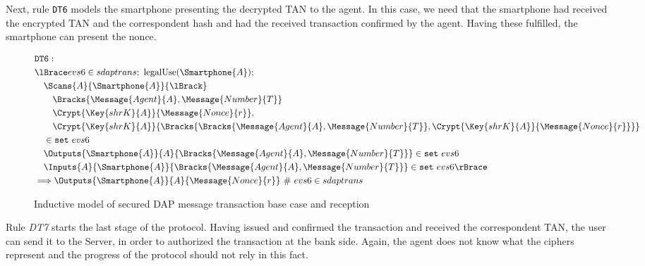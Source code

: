 Next, rule \texttt{DT6} models the smartphone presenting the decrypted TAN to the agent. In this case, we need that the smartphone had received the encrypted TAN and the correspondent hash and had the received transaction confirmed by the agent. Having these fulfilled, the smartphone can present the nonce.

\begin{figure}[!h]
  \begin{align*}
    & \texttt{DT6}: \newline \\
    & \lBrace evs6 \in sdaptrans;\ \text{legalUse}(\Smartphone{A}); \\
    & \quad \Scans{A}{\Smartphone{A}}{\lBrack} \\
    & \qquad \Bracks{\Message{Agent}{A}, \Message{Number}{T}} \\
    & \qquad \Crypt{\Key{shrK}{A}}{\Message{Nonce}{r}}, \\
    & \qquad \Crypt{\Key{shrK}{A}}{\Bracks{\Bracks{\Message{Agent}{A}, \Message{Number}{T}}, \Crypt{\Key{shrK}{A}}{\Message{Nonce}{r}}}} \\
    & \quad \in \texttt{set} \ evs6 \\
    & \quad \Outputs{\Smartphone{A}}{A}{\Bracks{\Message{Agent}{A}, \Message{Number}{T}}} \in \texttt{set} \ evs6 \\
    & \quad \Inputs{A}{\Smartphone{A}}{\Bracks{\Message{Agent}{A}, \Message{Number}{T}}} \in \texttt{set} \ evs6 \rBrace \\ 
    & \Longrightarrow \Outputs{\Smartphone{A}}{A}{\Message{Nonce}{r}} \ \# \ evs6 \in sdaptrans
  \end{align*}
  \label{fig:dap-model-6}
  \caption{Inductive model of secured DAP message transaction base case and reception}
\end{figure}

Rule \textit{DT7} starts the last stage of the protocol. Having issued and confirmed the transaction and received the correspondent TAN, the user can send it to the Server, in order to authorized the transaction at the bank side. Again, the agent does not know what the ciphers represent and the progress of the protocol should not rely in this fact.

